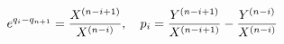 \begin{equation}
e^{q_i-q_{n+1}} ={X^{(n-i+1)}\over X^{(n-i)}},\quad p_i = {Y^{(n-i+1)}\over X^{(n-i+1)}}-{Y^{(n-i)}\over X^{(n-i)}}
\label{reconquant}
\end{equation}

